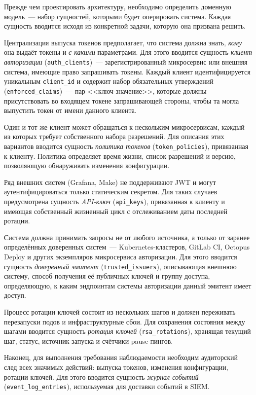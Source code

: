 Прежде чем проектировать архитектуру,
необходимо определить доменную модель~---
набор сущностей, которыми будет оперировать система.
Каждая сущность вводится исходя из конкретной задачи,
которую она призвана решить.

Централизация выпуска токенов предполагает,
что система должна знать, \emph{кому} она выдаёт токены
и \emph{с какими} параметрами.
Для этого вводится сущность \emph{клиент авторизации} (\texttt{auth\_clients})~---
зарегистрированный микросервис или внешняя система,
имеющие право запрашивать токены.
Каждый клиент идентифицируется уникальным \texttt{client\_id}
и содержит набор обязательных утверждений (\texttt{enforced\_claims})~---
пар <<ключ-значение>>, которые должны присутствовать
во входящем токене запрашивающей стороны,
чтобы та могла выпустить токен от имени данного клиента.

Один и тот же клиент может обращаться к нескольким микросервисам,
каждый из которых требует собственного набора разрешений.
Для описания этих вариантов вводится сущность
\emph{политика токенов} (\texttt{token\_policies}),
привязанная к клиенту.
Политика определяет время жизни, список разрешений
и версию, позволяющую обнаруживать изменения конфигурации.

Ряд внешних систем (Grafana, Make) не поддерживают JWT
и могут аутентифицироваться только статическим секретом.
Для таких случаев предусмотрена сущность
\emph{API-ключ} (\texttt{api\_keys}),
привязанная к клиенту и имеющая собственный жизненный цикл
с отслеживанием даты последней ротации.

Система должна принимать запросы не от любого источника,
а только от заранее определённых доверенных систем~---
Kubernetes-кластеров, GitLab CI, Octopus Deploy
и других экземпляров микросервиса авторизации.
Для этого вводится сущность
\emph{доверенный эмитент} (\texttt{trusted\_issuers}),
описывающая внешнюю систему, способ получения её публичных ключей
и группу доступа, определяющую, к каким эндпоинтам системы авторизации
данный эмитент имеет доступ.

Процесс ротации ключей состоит из нескольких шагов
и должен переживать перезапуски подов и инфраструктурные сбои.
Для сохранения состояния между шагами вводится сущность
\emph{ротация ключей} (\texttt{rsa\_rotations}),
хранящая текущий шаг, статус, источник запуска
и счётчики pause-пингов.

Наконец, для выполнения требования наблюдаемости
необходим аудиторский след всех значимых действий:
выпуска токенов, изменения конфигурации, ротации ключей.
Для этого вводится сущность
\emph{журнал событий} (\texttt{event\_log\_entries}),
используемая для доставки событий в SIEM.

